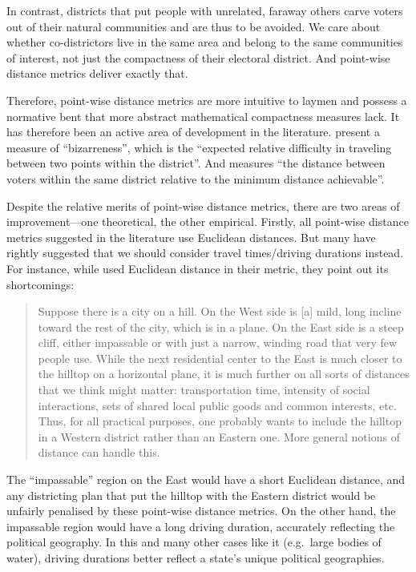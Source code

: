 \documentclass[]{article}
\begin{document}
In contrast, districts that put people with unrelated, faraway others
carve voters out of their natural communities and are thus to be
avoided. We care about whether co-districtors live in the same area and
belong to the same communities of interest, not just the compactness of
their electoral district. And point-wise distance metrics deliver
exactly that.

Therefore, point-wise distance metrics are more intuitive to laymen and
possess a normative bent that more abstract mathematical compactness
measures lack. It has therefore been an active area of development in
the literature. \cite{cm2010} present a measure of ``bizarreness'',
which is the ``expected relative difficulty in traveling between two
points within the district''. And \cite{fh2011} measures ``the distance
between voters within the same district relative to the minimum distance
achievable''.

Despite the relative merits of point-wise distance metrics, there are
two areas of improvement---one theoretical, the other empirical.
Firstly, all point-wise distance metrics suggested in the literature use
Euclidean distances. But many have rightly suggested that we should
consider travel times/driving durations instead. For instance, while
\cite{fh2011} used Euclidean distance in their metric, they point out
its shortcomings:

\begin{quote}
Suppose there is a city on a hill. On the West side is {[}a{]} mild,
long incline toward the rest of the city, which is in a plane. On the
East side is a steep cliff, either impassable or with just a narrow,
winding road that very few people use. While the next residential center
to the East is much closer to the hilltop on a horizontal plane, it is
much further on all sorts of distances that we think might matter:
transportation time, intensity of social interactions, sets of shared
local public goods and common interests, etc. Thus, for all practical
purposes, one probably wants to include the hilltop in a Western
district rather than an Eastern one. More general notions of distance
can handle this.
\end{quote}

The ``impassable'' region on the East would have a short Euclidean
distance, and any districting plan that put the hilltop with the Eastern
district would be unfairly penalised by these point-wise distance
metrics. On the other hand, the impassable region would have a long
driving duration, accurately reflecting the political geography. In this
and many other cases like it (e.g.~large bodies of water), driving
durations better reflect a state's unique political geographies.
\end{document}
